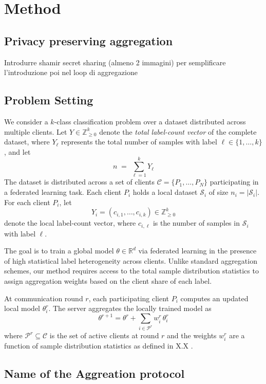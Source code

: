 \documentclass[runningheads]{llncs}
\begin{document}
\section{Method}

\subsection{Privacy preserving aggregation}

Introdurre shamir secret sharing (almeno 2 immagini) per semplificare l'introduzione poi nel loop di aggregazione

\subsection{Problem Setting}

We consider a $k$-class classification problem over a dataset distributed across
multiple clients. Let $Y \in \mathbb{Z}_{\ge 0}^k$ denote the \emph{total label-count vector}
of the complete dataset, where $Y_\ell$ represents the total number of samples with
label $\ell \in \{1,\dots,k\}$, and let
\[
n \;=\; \sum_{\ell=1}^{k} Y_\ell
\]
The dataset is distributed across a set of clients
$\mathcal{C} = \{P_1,\dots,P_N\}$ participating in a federated learning task.
Each client $P_i$ holds a local dataset $\mathcal{S}_i$ of size $n_i = |\mathcal{S}_i|$.
For each client $P_i$, let
\[
Y_i = (c_{i,1},\dots,c_{i,k}) \in \mathbb{Z}_{\ge 0}^k
\]
denote the local label-count vector, where $c_{i,\ell}$ is the number of samples in
$\mathcal{S}_i$ with label $\ell$.

The goal is to train a global model $\theta \in \mathbb{R}^d$ via federated learning
in the presence of high statistical label heterogeneity across clients.
Unlike standard aggregation schemes, our method requires access to the
total sample distribution statistics to assign aggregation weights based on the client share of each label.

At communication round $r$, each participating client $P_i$ computes an updated local model $\theta_i^{r}$. The server aggregates the locally trained model as
\[
\theta^{r+1}
=
\theta^{r}
+
\sum_{i \in \mathcal{P}^{r}} w_i^{r} \, \theta_i^{r}
\]
where $\mathcal{P}^{r} \subseteq \mathcal{C}$ is the set of active clients at round $r$
and the weights $w_i^{r}$ are a function of sample distribution statistics as defined in X.X .

\subsection{Name of the Aggreation protocol}
\end{document}
